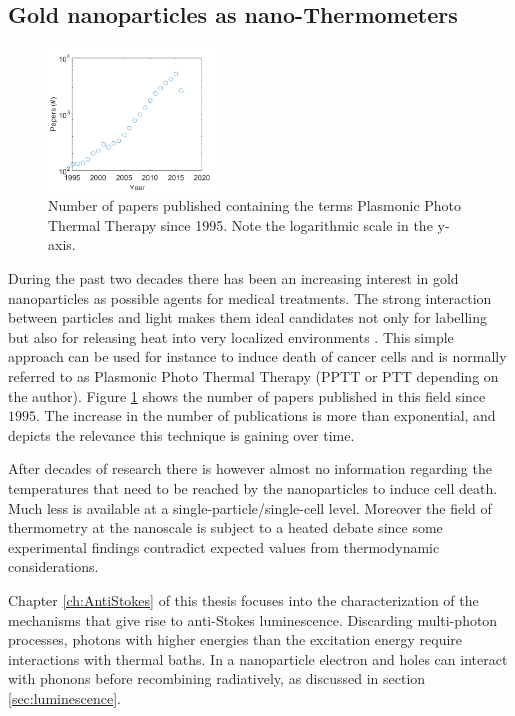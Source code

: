 \subsection{Gold nanoparticles as nano-Thermometers}
\begin{figure}[htp]
 \centering
 \includegraphics[width=0.40\textwidth]{Chapters/01_Introduction/Figures/paper_PT_therapy.png}
 \caption{Number of papers published containing the terms Plasmonic Photo
 Thermal Therapy since 1995. Note the logarithmic scale in the y-axis.}
 \label{fig:PPTT}
\end{figure}

During the past two decades there has been an increasing interest in gold
nanoparticles as possible agents for medical
treatments\cite{Gobin2007,Huang2006,Huo2014}. The strong interaction between
particles and light makes them ideal candidates not only for labelling but also
for releasing heat into very localized environments
\cite{Huang2008,Huang2006,Gobin2007,Hirsch2003}.
This simple approach can be used for instance to induce death of cancer cells
and is normally referred to as Plasmonic Photo Thermal Therapy (PPTT or PTT
depending on the author). Figure \ref{fig:PPTT} shows the number of papers
published in this field since $1995$. The increase in the number of publications
is more than exponential, and depicts the relevance this technique is gaining
over time.

After decades of research there is however almost no information regarding the
temperatures that need to be reached by the nanoparticles to induce cell death.
Much less is available at a single-particle/single-cell level. Moreover the
field of thermometry at the nanoscale is subject to a heated
debate\cite{Yang2011a,Suzuki2015} since some experimental
findings\cite{Yang2011a} contradict expected values from thermodynamic
considerations\cite{Sato2014}.

Chapter \ref{ch:AntiStokes} of this thesis focuses into the characterization of
the mechanisms that give rise to anti-Stokes luminescence. Discarding
multi-photon processes, photons with higher energies than the excitation energy
require interactions with thermal baths. In a nanoparticle electron and holes
can interact with phonons before recombining radiatively, as discussed in
section \ref{sec:luminescence}.

